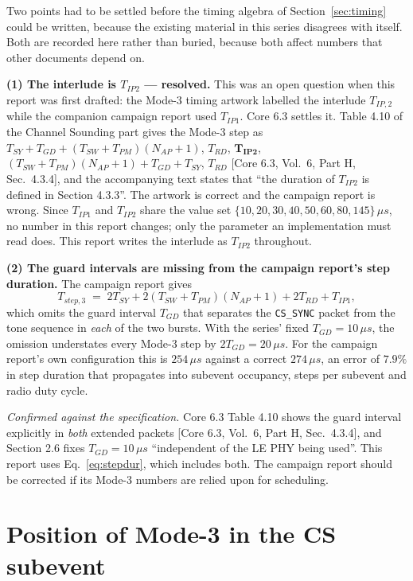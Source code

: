 \documentclass[11pt,a4paper]{article}
\newcommand{\us}{\,\ensuremath{\upmu}s}
\newcommand{\Tsy}{T_{SY}}
\newcommand{\Tgd}{T_{GD}}
\newcommand{\Tsw}{T_{SW}}
\newcommand{\Tpm}{T_{PM}}
\newcommand{\Trd}{T_{RD}}
\newcommand{\Tipthree}{T_{IP2}}
\newcommand{\Nap}{N_{AP}}
\newcommand{\code}[1]{\texttt{\small #1}}
\providecommand{\upmu}{\mu}
\newcommand{\core}[1]{\textcolor{rulegrey}{\small[Core 6.3, #1]}}
\begin{document}
Two points had to be settled before the timing algebra of Section~\ref{sec:timing} could be written,
because the existing material in this series disagrees with itself. Both are recorded here rather
than buried, because both affect numbers that other documents depend on.

\begin{callout}
\textbf{(1) The interlude is $T_{IP2}$ --- resolved.} This was an open question when this report was
first drafted: the Mode-3 timing artwork labelled the interlude $T_{IP,2}$ while the companion campaign
report used $T_{IP1}$. Core 6.3 settles it. Table 4.10 of the Channel Sounding part gives the Mode-3
step as $\Tsy+\Tgd+(\Tsw+\Tpm)(\Nap+1)$, $\Trd$, $\mathbf{T_{IP2}}$,
$(\Tsw+\Tpm)(\Nap+1)+\Tgd+\Tsy$, $\Trd$ \core{Vol.\ 6, Part H, Sec.\ 4.3.4}, and the accompanying
text states that ``the duration of $T_{IP2}$ is defined in Section 4.3.3''. The artwork is correct and
the campaign report is wrong. Since $T_{IP1}$ and $T_{IP2}$ share the value set
$\{10,20,30,40,50,60,80,145\}\us$, no number in this report changes; only the parameter an
implementation must read does. This report writes the interlude as $\Tipthree$ throughout.
\end{callout}

\begin{caution}
\textbf{(2) The guard intervals are missing from the campaign report's step duration.} The campaign
report gives
\[
T_{step,3} \;=\; 2\Tsy + 2(\Tsw+\Tpm)(\Nap+1) + 2\Trd + T_{IP1},
\]
which omits the guard interval $\Tgd$ that separates the \code{CS\_SYNC} packet from the tone
sequence in \emph{each} of the two bursts. With the series' fixed $\Tgd = 10\us$, the omission
understates every Mode-3 step by $2\Tgd = 20\us$. For the campaign report's own configuration this is
$254\us$ against a correct $274\us$, an error of $7.9\%$ in step duration that propagates into
subevent occupancy, steps per subevent and radio duty cycle.

\emph{Confirmed against the specification.} Core 6.3 Table 4.10 shows the guard interval explicitly
in \emph{both} extended packets \core{Vol.\ 6, Part H, Sec.\ 4.3.4}, and Section 2.6 fixes
$\Tgd = 10\us$ ``independent of the LE PHY being used''. This report uses
Eq.~\eqref{eq:stepdur}, which includes both. The campaign report should be corrected if its Mode-3
numbers are relied upon for scheduling.
\end{caution}

\section{Position of Mode-3 in the CS subevent}
\end{document}
